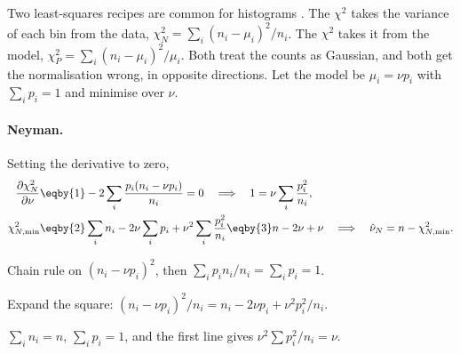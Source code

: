 Two least-squares recipes are common for histograms .
The  $\chi^2$ takes the variance of each bin from the data,
$\chi^2_N=\sum_i(n_i-\mu_i)^2/n_i$. The  $\chi^2$ takes it
from the model, $\chi^2_P=\sum_i(n_i-\mu_i)^2/\mu_i$. Both treat the counts
as Gaussian, and both get the normalisation wrong, in opposite directions.
Let the model be $\mu_i=\nu p_i$ with $\sum_ip_i=1$ and minimise over $\nu$.

\paragraph{Neyman.} Setting the derivative to zero,
\begin{align*}
  \frac{\partial\chi^2_N}{\partial\nu}
  &\eqby{1}-2\sum_i\frac{p_i(n_i-\nu p_i)}{n_i}=0
  \quad\Longrightarrow\quad
  1=\nu\sum_i\frac{p_i^2}{n_i},\\
  \chi^2_{N,\min}
  &\eqby{2}\sum_i n_i-2\nu\sum_ip_i+\nu^2\sum_i\frac{p_i^2}{n_i}
  \eqby{3}n-2\nu+\nu
  \quad\Longrightarrow\quad
  \hat\nu_N=n-\chi^2_{N,\min} .
\end{align*}
\begin{explain}
  \item Chain rule on $(n_i-\nu p_i)^2$, then $\sum_ip_in_i/n_i=\sum_ip_i=1$.
  \item Expand the square: $(n_i-\nu p_i)^2/n_i=n_i-2\nu p_i+\nu^2p_i^2/n_i$.
  \item $\sum_in_i=n$, $\sum_ip_i=1$, and the first line gives
        $\nu^2\sum p_i^2/n_i=\nu$.
\end{explain}

